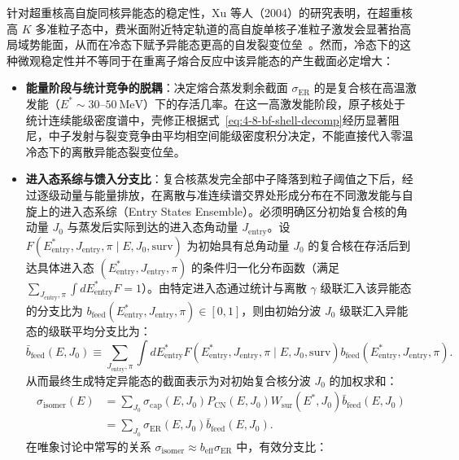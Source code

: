 针对超重核高自旋同核异能态的稳定性，Xu 等人（2004）的研究表明，在超重核高 $K$ 多准粒子态中，费米面附近特定轨道的高自旋单核子准粒子激发会显著抬高局域势能面，从而在冷态下赋予异能态更高的自发裂变位垒~\cite{xu-2004-superheavy-high-spin-isomer-stability}。然而，冷态下的这种微观稳定性并不等同于在重离子熔合反应中该异能态的产生截面必定增大：
\begin{itemize}
\item \textbf{能量阶段与统计竞争的脱耦}：决定熔合蒸发剩余截面 $\sigma_{\mathrm{ER}}$ 的是复合核在高温激发能（$E^* \sim 30$--$50\ \mathrm{MeV}$）下的存活几率。在这一高激发能阶段，原子核处于统计连续能级密度谱中，壳修正根据式~\eqref{eq:4-8-bf-shell-decomp}经历显著阻尼，中子发射与裂变竞争由平均相空间能级密度积分决定，不能直接代入零温冷态下的离散异能态裂变位垒。
\item \textbf{进入态系综与馈入分支比}：复合核蒸发完全部中子降落到粒子阈值之下后，经过逐级动量与能量排放，在离散与准连续谱交界处形成分布在不同激发能与自旋上的进入态系综（Entry States Ensemble）。必须明确区分初始复合核的角动量 $J_0$ 与蒸发后实际到达的进入态角动量 $J_{\mathrm{entry}}$。设 $F(E_{\mathrm{entry}}^*, J_{\mathrm{entry}}, \pi \mid E, J_0, \mathrm{surv})$ 为初始具有总角动量 $J_0$ 的复合核在存活后到达具体进入态 $(E_{\mathrm{entry}}^*, J_{\mathrm{entry}}, \pi)$ 的条件归一化分布函数（满足 $\sum_{J_{\mathrm{entry}}, \pi} \int dE_{\mathrm{entry}}^* F = 1$）。由特定进入态通过统计与离散 $\gamma$ 级联汇入该异能态的分支比为 $b_{\mathrm{feed}}(E_{\mathrm{entry}}^*, J_{\mathrm{entry}}, \pi) \in [0, 1]$，则由初始分波 $J_0$ 级联汇入异能态的级联平均分支比为：
\begin{equation}\label{eq:4-8-bfeed-j0-def}
\bar{b}_{\mathrm{feed}}(E, J_0) \equiv \sum_{J_{\mathrm{entry}}, \pi} \int dE_{\mathrm{entry}}^* F(E_{\mathrm{entry}}^*, J_{\mathrm{entry}}, \pi \mid E, J_0, \mathrm{surv}) b_{\mathrm{feed}}(E_{\mathrm{entry}}^*, J_{\mathrm{entry}}, \pi).
\end{equation}
从而最终生成特定异能态的截面表示为对初始复合核分波 $J_0$ 的加权求和：
\begin{equation}\label{eq:4-8-isomer-feeding-ensemble}
\begin{aligned}
\sigma_{\mathrm{isomer}}(E) &= \sum_{J_0} \sigma_{\mathrm{cap}}(E, J_0) P_{\mathrm{CN}}(E, J_0) W_{\mathrm{sur}}(E^*, J_0) \bar{b}_{\mathrm{feed}}(E, J_0) \\
&= \sum_{J_0} \sigma_{\mathrm{ER}}(E, J_0) \bar{b}_{\mathrm{feed}}(E, J_0).
\end{aligned}
\end{equation}
在唯象讨论中常写的关系 $\sigma_{\mathrm{isomer}} \approx b_{\mathrm{eff}} \sigma_{\mathrm{ER}}$ 中，有效分支比：

\end{itemize}
